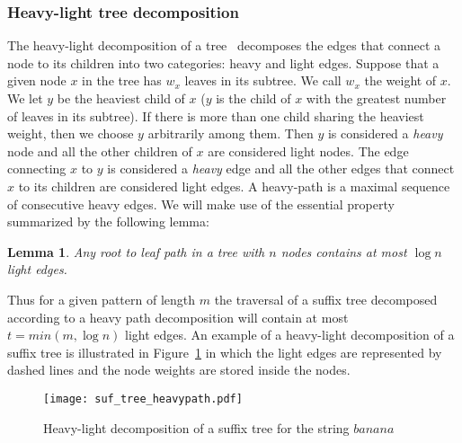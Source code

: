 \documentclass{article}
\newcommand{\?}{\mskip1.5mu}
\newtheorem{lemma}{Lemma}
\newcounter{noqed}
\newcommand{\qed}{ \ifmmode\mbox{
}\fi\rule[-.05em]{.3em}{.7em}\setcounter{noqed}{0}}
\newenvironment{proof}[1][{}]{\noindent{\bf Proof#1.
}\setcounter{noqed}{1}}{\ifnum\value{noqed}=1\qed\fi\par\medskip}
\begin{document}
\subsubsection{Heavy-light tree decomposition}
The heavy-light decomposition of a tree~\cite{HT84} decomposes the edges that connect a node to its children into two categories: heavy and light edges. Suppose that a given node $x$ in the tree has $w_x$ leaves in its subtree. We call $w_x$ the weight of $x$. We let $y$ be the heaviest child of $x$ ($y$ is the child of $x$ with the greatest number of leaves in its subtree). If there is more than one child sharing the heaviest weight, then we choose $y$ arbitrarily among them. Then $y$ is considered  a \emph{heavy} node and all the other children of $x$ are considered light nodes. The edge connecting $x$ to $y$ is considered a \emph{heavy} edge and all the other edges that connect $x$ to its children are considered light edges. A heavy-path is a maximal sequence of consecutive heavy edges. We will make use of the essential property summarized by  the following lemma:
\begin{lemma}
Any root to leaf path in a tree with $n$ nodes contains at most $\log n$ light edges.
\end{lemma}
\begin{comment}
\begin{proof}
Suppose that the path traverses $t\geq \log n$ light edges. First note that if a light edge connects a node $x$ of weight $w_x$ to its child node $y$ of weight $w_y$, then necessarily $w_y\leq w_x/2$. This can be proved by contradiction. Suppose that $w_y>w_x/2$. Then the heaviest child of $x$ has weight at least $w_y$ which means that $w_x\geq 2w_y>w_x$. So each time we traverse a light edge we divide the size of the subtree (in terms of the number of leaves) by a factor of at least $2$. In order to reach a node of weight $1$ (a leaf) starting from a node of weight $w$ we can traverse at most $\log_2 w$ light edges as, at each traversal of a light edge, we get to a subtree whose number of leaves is at most half the number of nodes in the parent node subtree. 
\qed
\end{proof}
\end{comment}
Thus for a given pattern of length $m$ the traversal of a suffix tree decomposed according to a heavy path decomposition will contain at most $t=min(m,\log n)$ light edges. An example of a heavy-light decomposition of a suffix tree is illustrated in Figure~\ref{pic:heavy_path_suf_tree} in which the light edges are represented by dashed lines and the node weights are stored inside the nodes. 
\begin{figure}[htb] 
\centering\texttt{[image: suf\_tree\_heavypath.pdf]} 
\caption{Heavy-light decomposition of a suffix tree for the string $banana$} \label{pic:heavy_path_suf_tree} \end{figure}
\end{document}
